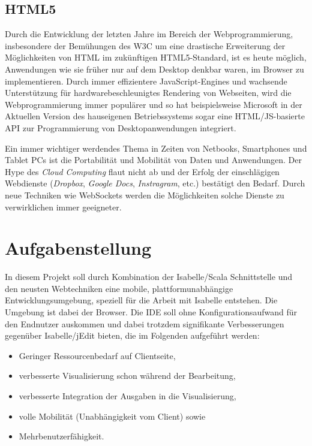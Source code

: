 \subsection{HTML5}

Durch die Entwicklung der letzten Jahre im Bereich der Webprogrammierung, insbesondere der
Bemühungen des W3C um eine drastische Erweiterung der Möglichkeiten von HTML im zukünftigen
HTML5-Standard, ist es heute möglich, Anwendungen wie sie früher nur auf dem Desktop denkbar waren,
im Browser zu implementieren. Durch immer effizientere JavaScript-Engines und wachsende
Unterstützung für hardwarebeschleunigtes Rendering von Webseiten, wird die Webprogrammierung immer
populärer und so hat beispielsweise Microsoft in der Aktuellen Version des hauseigenen
Betriebssystems sogar eine HTML/JS-basierte API zur Programmierung von Desktopanwendungen
integriert.

Ein immer wichtiger werdendes Thema in Zeiten von Netbooks, Smartphones und Tablet PCs ist die
Portabilität und Mobilität von Daten und Anwendungen. Der Hype des \textit{Cloud Computing} flaut
nicht ab und der Erfolg der einschlägigen Webdienste (\textit{Dropbox}, \textit{Google Docs},
\textit{Instragram}, etc.) bestätigt den Bedarf. Durch neue Techniken wie WebSockets werden die
Möglichkeiten solche Dienste zu verwirklichen immer geeigneter.

\section{Aufgabenstellung}

In diesem Projekt soll durch Kombination der Isabelle/Scala Schnittstelle und den neusten
Webtechniken eine mobile, plattformunabhängige Entwicklungsumgebung, speziell für die Arbeit mit
Isabelle entstehen. Die Umgebung ist dabei der Browser. Die IDE soll ohne Konfigurationsaufwand für
den Endnutzer auskommen und dabei trotzdem signifikante Verbesserungen gegenüber Isabelle/jEdit
bieten, die im Folgenden aufgeführt werden:

\begin{itemize}
  \item Geringer Ressourcenbedarf auf Clientseite,
  \item verbesserte Visualisierung schon während der Bearbeitung,
  \item verbesserte Integration der Ausgaben in die Visualisierung,
  \item volle Mobilität (Unabhängigkeit vom Client) sowie
  \item Mehrbenutzerfähigkeit.
\end{itemize}


